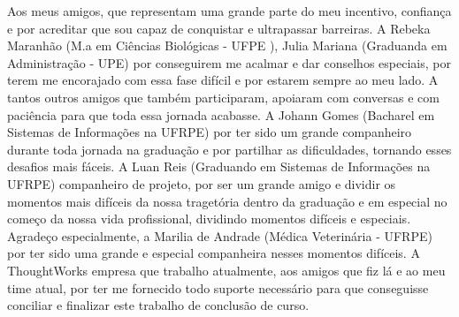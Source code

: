 Aos meus amigos, que representam uma grande parte do meu incentivo, confiança e por acreditar que sou capaz de conquistar e ultrapassar barreiras. A Rebeka Maranhão (M.a em Ciências Biológicas - UFPE ), Julia Mariana (Graduanda em Administração - UPE)  por conseguirem me acalmar e dar conselhos especiais, por terem me encorajado com essa fase difícil e por estarem sempre ao meu lado. A tantos outros amigos que também participaram, apoiaram com conversas e com paciência para que toda essa jornada acabasse. A Johann Gomes (Bacharel em Sistemas de Informações na UFRPE) por ter sido um grande companheiro durante toda jornada na graduação e por partilhar as dificuldades, tornando esses desafios mais fáceis. A Luan Reis (Graduando em Sistemas de Informações na UFRPE) companheiro de projeto, por ser um grande amigo e dividir os momentos mais difíceis da nossa tragetória dentro da graduação e em especial no começo da nossa vida profissional, dividindo momentos difíceis e especiais. Agradeço especialmente, a Marilia de Andrade (Médica Veterinária - UFRPE) por ter sido uma grande e especial companheira nesses momentos difíceis. A ThoughtWorks empresa que trabalho atualmente, aos amigos que fiz lá e ao meu time atual, por ter me fornecido todo suporte necessário para que conseguisse conciliar e finalizar este trabalho de conclusão de curso. 
